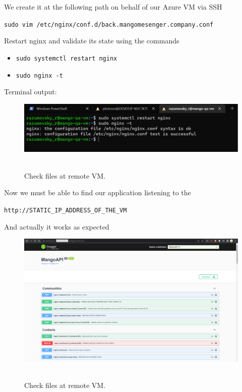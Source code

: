 We create it at the following path on behalf of our Azure VM via SSH
\begin{center}
    \texttt{sudo vim /etc/nginx/conf.d/back.mangomesenger.company.conf}
\end{center}
Restart nginx and validate its state using the commands
\begin{itemize}
    \item \texttt{sudo systemctl restart nginx}
    \item \texttt{sudo nginx -t}
\end{itemize}
Terminal output:
\begin{figure}[H]
    \centering
    \includegraphics[width=1\textwidth]{img/06_test_nginx}
    ~\caption{Check files at remote VM.}\label{fig:figure16}
\end{figure}
Now we must be able to find our application listening to the
\begin{center}
    \texttt{http://STATIC\_IP\_ADDRESS\_OF\_THE\_VM}
\end{center}
And actually it works as expected
\begin{figure}[H]
    \centering
    \includegraphics[width=1\textwidth]{img/06_view_in_browser}
    ~\caption{Check files at remote VM.}\label{fig:figure17}
\end{figure}
